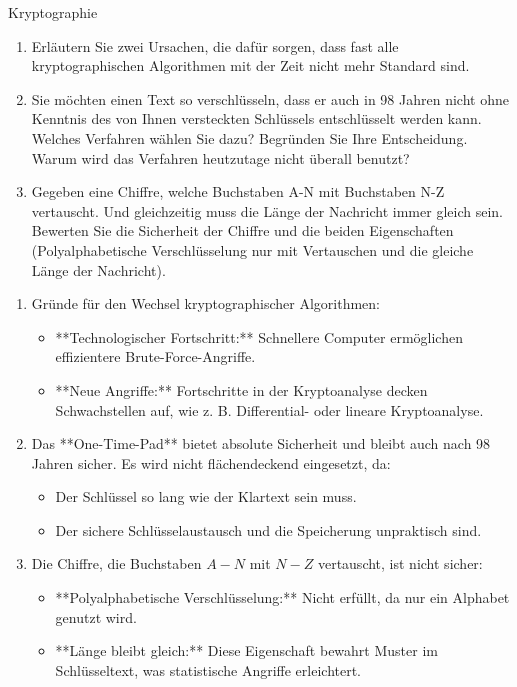 \documentclass{article}
\begin{document}
\begin{exercise}{Kryptographie}
 \begin{enumerate}
  \item Erläutern Sie zwei Ursachen, die dafür sorgen, dass fast alle kryptographischen Algorithmen mit der Zeit nicht mehr Standard sind.
  \item Sie möchten einen Text so verschlüsseln, dass er auch in 98 Jahren nicht ohne Kenntnis des von Ihnen versteckten Schlüssels entschlüsselt werden kann. Welches Verfahren wählen Sie dazu? Begründen Sie Ihre Entscheidung. Warum wird das Verfahren heutzutage nicht überall benutzt?
  \item Gegeben eine Chiffre, welche Buchstaben A-N mit Buchstaben N-Z vertauscht. Und gleichzeitig muss die Länge der Nachricht immer gleich sein. Bewerten Sie die Sicherheit der Chiffre und die beiden Eigenschaften (Polyalphabetische Verschlüsselung nur mit Vertauschen und die gleiche Länge der Nachricht).
 \end{enumerate}

 \begin{solution}
  \begin{enumerate}
      \item Gründe für den Wechsel kryptographischer Algorithmen:
      \begin{itemize}
          \item **Technologischer Fortschritt:** Schnellere Computer ermöglichen effizientere Brute-Force-Angriffe.
          \item **Neue Angriffe:** Fortschritte in der Kryptoanalyse decken Schwachstellen auf, wie z. B. Differential- oder lineare Kryptoanalyse.
      \end{itemize}
      \item Das **One-Time-Pad** bietet absolute Sicherheit und bleibt auch nach 98 Jahren sicher. Es wird nicht flächendeckend eingesetzt, da:
      \begin{itemize}
          \item Der Schlüssel so lang wie der Klartext sein muss.
          \item Der sichere Schlüsselaustausch und die Speicherung unpraktisch sind.
      \end{itemize}
      \item Die Chiffre, die Buchstaben $ A-N $ mit $ N-Z $ vertauscht, ist nicht sicher:
      \begin{itemize}
          \item **Polyalphabetische Verschlüsselung:** Nicht erfüllt, da nur ein Alphabet genutzt wird.
          \item **Länge bleibt gleich:** Diese Eigenschaft bewahrt Muster im Schlüsseltext, was statistische Angriffe erleichtert.
      \end{itemize}
  \end{enumerate}
\end{solution}
\end{exercise}
\end{document}
